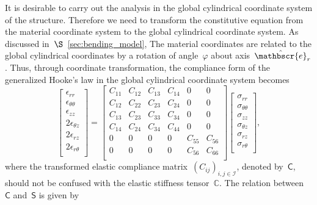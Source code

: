 \documentclass[preprint,10pt,times]{elsarticle}
\numberwithin{equation}{section}
\newcommand{\physe}{\hat{\mathbscr{e}}} %
\renewcommand{\u}[1]{\boldsymbol{#1}}
\newcommand{\usf}[1]{\u{\mathsf #1}}
\newcommand{\pr}[1]{\left( #1 \right)}
\renewcommand{\>}{$\Rightarrow$}
\begin{document}
It is desirable to carry out the analysis in the global cylindrical coordinate system of the structure.
Therefore we need to transform the constitutive equation from the material coordinate system to the global cylindrical coordinate system.
As discussed in~$\S$~\ref{sec:bending_model}, The material coordinates are related to the global cylindrical coordinates by a rotation of angle~$\varphi$ about axis~$\physe_{r}$.
Thus, through coordinate transformation, the compliance form of the generalized Hooke's law in the global cylindrical coordinate system becomes
\begin{equation}
	\left[
	\begin{array}{c}
	\epsilon_{rr} \\ \epsilon_{\theta\theta} \\ \epsilon_{zz} \\
	2\epsilon_{\theta z} \\ 2\epsilon_{r z} \\ 2\epsilon_{r \theta} \\
	\end{array}
	\right]
	=
	\left[
	\begin{array}{cccccc}
	 C_{11} & C_{12} & C_{13} & C_{14} & 0 & 0 \\
	 C_{12} & C_{22} & C_{23} & C_{24} & 0 & 0 \\
	 C_{13} & C_{23} & C_{33} & C_{34} & 0 & 0 \\
	 C_{14} & C_{24} & C_{34} & C_{44} & 0 & 0 \\
	 0 & 0 & 0 & 0 & C_{55} & C_{56} \\
	 0 & 0 & 0 & 0 & C_{56} & C_{66} \\
	\end{array}
	\right]
	\left[
	\begin{array}{c}
	\sigma_{rr} \\ \sigma_{\theta\theta} \\ \sigma_{zz} \\
	\sigma_{\theta z} \\ \sigma_{rz} \\ \sigma_{r \theta} \\
	\end{array}
	\right],
	\label{eq:HookeGlobal}
\end{equation}
where the transformed elastic compliance matrix~$\pr{C_{ij}}_{i,j \in\mathcal{I}}$, denoted by~$\usf{C}$, should not be confused with the elastic stiffness tensor~$\mathbb{C}$. The relation between~$\usf{C}$ and~$\usf{S}$ is given by
\end{document}

